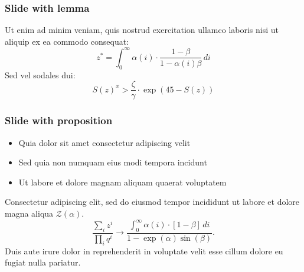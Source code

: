 \expandafter\documentclass\expandafter[\presentationclassoptions]{beamer}
\begin{document}
\begin{frame}
  \frametitle{Slide with lemma}
  \begin{lemma}
    Ut enim ad minim veniam, quis nostrud exercitation ullamco laboris nisi ut aliquip ex ea commodo consequat:
    \begin{equation}
      z^* = \int_{0}^{\infty} \alpha(i) \cdot \frac{1-\beta}{1-\alpha(i)\beta}\,di
    \end{equation}
    Sed vel sodales dui:
    \begin{equation}
      S(z)^x > \frac{\zeta}{\gamma} \cdot \exp(45- S(z))
    \end{equation}
  \end{lemma}
\end{frame}

\begin{frame}
  \frametitle{Slide with proposition}
  \singlespacing
  \begin{itemize}
    \item Quia dolor sit amet consectetur adipiscing velit
    \item Sed quia non numquam eius modi tempora incidunt
    \item Ut labore et dolore magnam aliquam quaerat voluptatem
  \end{itemize}
  \begin{proposition}
    Consectetur adipiscing elit, sed do eiusmod tempor incididunt ut labore et dolore magna aliqua $\mathcal{Z}(\alpha)$.
    \begin{equation*}
      \frac{\sum_i z^i}{\prod_i q^i} \to \frac{\int_{0}^{\infty} \alpha(i) \cdot [1-\beta]\,di}{1-\exp(\alpha)\sin(\beta)}.
    \end{equation*}
    Duis aute irure dolor in reprehenderit in voluptate velit esse cillum dolore eu fugiat nulla pariatur.
  \end{proposition}
\end{frame}
\end{document}

